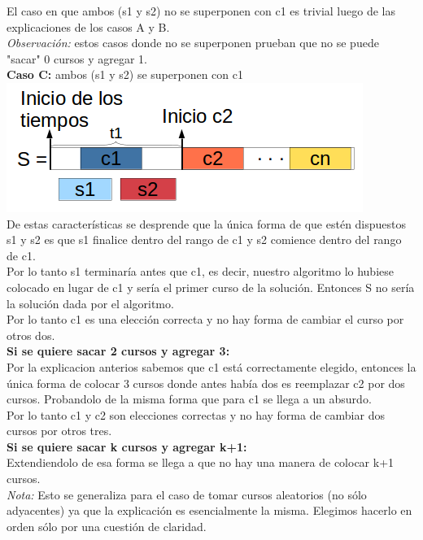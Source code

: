 El caso en que ambos (s1 y s2) no se superponen con c1 es trivial luego de las explicaciones de los casos A y B.\\
\textit{Observación:} estos casos donde no se superponen prueban que no se puede "sacar"  0 cursos y agregar 1.\\

\textbf{Caso C:} ambos (s1 y s2) se superponen con c1\\
\includegraphics[scale=0.8]{ej2/Graficos/casoC.png}\\
De estas características se desprende que la única forma de que estén dispuestos s1 y s2 es que s1 finalice dentro del rango de c1 y s2 comience dentro del rango de c1.\\
Por lo tanto s1 terminaría antes que c1, es decir, nuestro algoritmo lo hubiese colocado en lugar de c1 y sería el primer curso de la solución. Entonces S no sería la solución dada por el algoritmo.\\

Por lo tanto c1 es una elección correcta y no hay forma de cambiar el curso por otros dos.\\

\textbf{Si se quiere sacar 2 cursos y agregar 3:}\\
Por la explicacion anterios sabemos que c1 está correctamente elegido, entonces la única forma de colocar 3 cursos donde antes había dos es reemplazar c2 por dos cursos. Probandolo de la misma forma que para c1 se llega a un absurdo.\\

Por lo tanto c1 y c2 son elecciones correctas y no hay forma de cambiar dos cursos por otros tres.\\

\textbf{Si se quiere sacar k cursos y agregar k+1:}\\
Extendiendolo de esa forma se llega a que no hay una manera de colocar k+1 cursos.\\

\textit{Nota:} Esto se generaliza para el caso de tomar cursos aleatorios (no sólo adyacentes) ya que la explicación es esencialmente la misma. Elegimos hacerlo en orden sólo por una cuestión de claridad.\\



